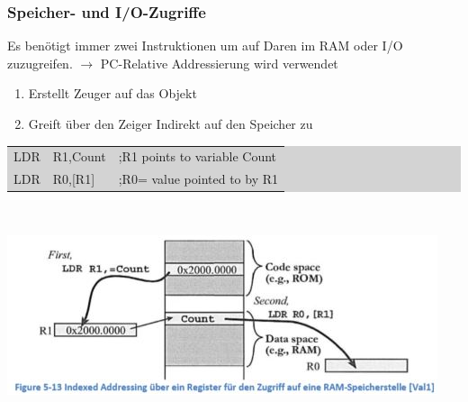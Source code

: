 \subsubsection{Speicher- und I/O-Zugriffe}
\begin{minipage}{10cm}
    Es benötigt immer zwei Instruktionen um auf Daren im RAM oder I/O zuzugreifen.
    $\rightarrow$ PC-Relative Addressierung wird verwendet
    \begin{enumerate}
        \item Erstellt Zeuger auf das Objekt
        \item Greift über den Zeiger Indirekt auf den Speicher zu
    \end{enumerate}
    \colorbox{lightgray}{
    \begin{tabular}{lll}
        LDR   &R1,Count   &;R1 points to variable Count\\ 
        LDR   &R0,[R1]    &;R0= value pointed to by R1\\ 
    \end{tabular} }
\end{minipage}
%
\begin{minipage}{0.5cm}
	\-\
\end{minipage}
%
\begin{minipage}{8cm}
	\includegraphics[width=\linewidth]{images/AddressingRAM}   
\end{minipage}






















